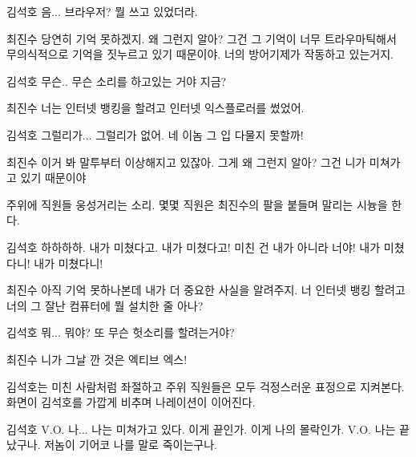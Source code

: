 \documentclass{screenplay}
\begin{document}
    \begin{dialogue}{김석호}
        음... 브라우저? 뭘 쓰고 있었더라.
    \end{dialogue}
    \begin{dialogue}{최진수}
        당연히 기억 못하겠지. 왜 그런지 알아?
        그건 그 기억이 너무 트라우마틱해서 무의식적으로 기억을 짓누르고 있기 때문이야. 
        너의 방어기제가 작동하고 있는거지.
    \end{dialogue}
    \begin{dialogue}{김석호}
        무슨.. 무슨 소리를 하고있는 거야 지금?
    \end{dialogue}
    \begin{dialogue}{최진수}
        너는 인터넷 뱅킹을 할려고 인터넷 익스플로러를 썼었어.
    \end{dialogue}
    \begin{dialogue}{김석호}
        그럴리가... 그럴리가 없어. 네 이놈 그 입 다물지 못할까!
    \end{dialogue}
    \begin{dialogue}{최진수}
        이거 봐 말투부터 이상해지고 있잖아. 그게 왜 그런지 알아?
        그건 니가 미쳐가고 있기 때문이야
    \end{dialogue}
    주위에 직원들 웅성거리는 소리. 몇몇 직원은 최진수의 팔을 붙들며 말리는 시늉을 한다.
    \begin{dialogue}{김석호}
        하하하하. 내가 미쳤다고. 내가 미쳤다고!
        미친 건 내가 아니라 너야! 내가 미쳤다니! 내가 미쳤다니!
    \end{dialogue}
    \begin{dialogue}{최진수}
        아직 기억 못하나본데 내가 더 중요한 사실을 알려주지.
        너 인터넷 뱅킹 할려고 너의 그 잘난 컴퓨터에 뭘 설치한 줄 아나?
    \end{dialogue}
    \begin{dialogue}[두려워하며]{김석호}
        뭐... 뭐야? 또 무슨 헛소리를 할려는거야?
    \end{dialogue}
    \begin{dialogue}{최진수}
        니가 그날 깐 것은
        엑티브
        엑스!
    \end{dialogue}
    
    김석호는 미친 사람처럼 좌절하고 주위 직원들은 모두 걱정스러운 표정으로 지켜본다. 화면이 김석호를 가깝게 비추며 나레이션이 이어진다.
    \begin{dialogue}{김석호}
        V.O. 나... 나는 미쳐가고 있다. 이게 끝인가. 이게 나의 몰락인가.
        V.O. 나는 끝났구나. 저놈이 기어코 나를 말로 죽이는구나.
    \end{dialogue}
    
\end{document}

